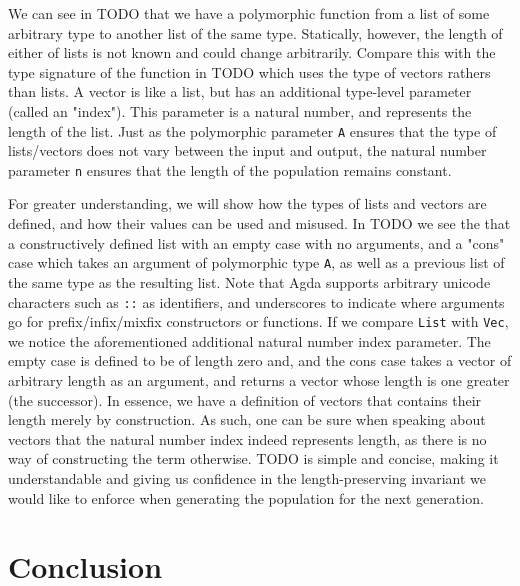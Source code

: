 \documentclass{acm_proc_article-sp}
\begin{document}

We can see in TODO
that we have a polymorphic function from a list of some arbitrary type
to another list of the same type. Statically, however, the length of
either of lists is not known and could change arbitrarily. Compare
this with the type signature of the function in TODO which uses the
type of vectors rathers than lists. A vector is like a list, but has
an additional type-level parameter (called an "index"). This parameter
is a natural number, and represents the length of the list. Just as
the polymorphic parameter \texttt{A} ensures that the type of lists/vectors
does not vary between the input and output, the natural number
parameter \texttt{n} ensures that the length of the population remains
constant.

For greater understanding, we will show how the types of lists and
vectors are defined, and how their values can be used and misused. In
TODO we see the that a constructively defined list with an empty case
with no arguments, and a "cons" case which takes an argument of
polymorphic type \texttt{A}, as well as a previous list of the same
type as the resulting list. Note that Agda supports arbitrary unicode
characters such as \texttt{::} as identifiers, and underscores to
indicate where arguments go for prefix/infix/mixfix constructors or
functions. If we compare \texttt{List} with \texttt{Vec}, we notice
the aforementioned additional natural number index parameter. The
empty case is defined to be of length zero and, and the cons case
takes a vector of arbitrary length as an argument, and returns a
vector whose length is one greater (the successor). In essence, we
have a definition of vectors that contains their length merely by
construction. As such, one can be sure when speaking about vectors
that the natural number index indeed represents length, as there is no
way of constructing the term otherwise. TODO is simple and concise,
making it understandable and giving us confidence in the
length-preserving invariant we would like to enforce when generating
the population for the next generation.


\section{Conclusion}




\end{document}
